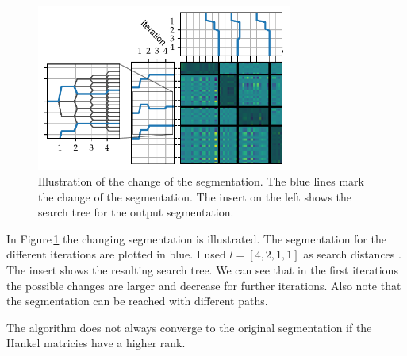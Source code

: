 \documentclass[doctype=mastersthesis,BCOR=15mm,biblatex]{ldvbook}%
\begin{document}
\begin{figure}[!htb]
	\centering
	\includegraphics[width=0.75\textwidth]{Plots/example_move_iterations.pdf}
	\caption{Illustration of the change of the segmentation.
		The blue lines mark the change of the segmentation.
		The insert on the left shows the search tree for the output segmentation.
	}
	\label{fig:example_move_bound}
\end{figure}
In Figure\,\ref{fig:example_move_bound} the changing segmentation is illustrated. 
The segmentation for the different iterations are plotted in blue.
I used $l = [4,2,1,1]$ as search distances .
The insert shows the resulting search tree. We can see that in the first iterations the possible changes are larger and decrease for further iterations.
Also note that the segmentation can be reached with different paths.

The algorithm does not always converge to the original segmentation if the Hankel matricies have a higher rank.
\end{document}
